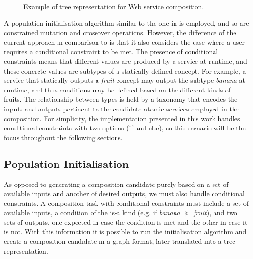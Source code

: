 \begin{figure}
\centerline{
}
\caption{Example of tree representation for Web service composition.}
\label{fig:tree}
\end{figure}

A population initialisation algorithm similar to the one in \cite{wang2013genetic} is employed, and so are constrained mutation and crossover operations. However, the difference of the current approach in comparison to \cite{wang2013genetic} is that it also considers the case where a user requires a conditional constraint to be met. The presence of conditional constraints means that different values are produced by a service at runtime, and these concrete values are subtypes of a statically defined concept. For example, a service that statically outputs a \textit{fruit} concept may output the subtype \textit{banana} at runtime, and thus conditions may be defined based on the different kinds of fruits. The relationship between types is held by a taxonomy that encodes the inputs and outputs pertinent to the candidate atomic services employed in the composition. For simplicity, the implementation presented in this work handles conditional constraints with two options (if and else), so this scenario will be the focus throughout the following sections.

\subsection{Population Initialisation}\label{init}
As opposed to generating a composition candidate purely based on a set of available inputs and another of desired outputs, we must also handle conditional constraints. A composition task with conditional constraints must include a set of available inputs, a condition of the is-a kind (e.g. if \textit{banana} $\succeq$ \textit{fruit}), and two sets of outputs, one expected in case the condition is met and the other in case it is not. With this information it is possible to run the initialisation algorithm and create a composition candidate in a graph format, later translated into a tree representation.

